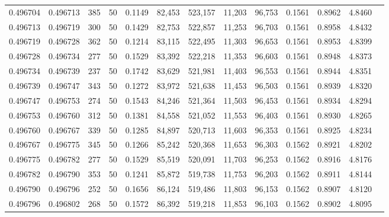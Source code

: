 \begin{tabular}{rrrrrrrrrrrrr}
0.496704 & 0.496713 & 385 &  50 &                                     0.1149 &  82,453 & 523,157 &  11,203 &  96,753 & 0.1561 & 0.8962 & 4.8460 \\
0.496713 & 0.496719 & 300 &  50 &                                     0.1429 &  82,753 & 522,857 &  11,253 &  96,703 & 0.1561 & 0.8958 & 4.8432 \\
0.496719 & 0.496728 & 362 &  50 &                                     0.1214 &  83,115 & 522,495 &  11,303 &  96,653 & 0.1561 & 0.8953 & 4.8399 \\
0.496728 & 0.496734 & 277 &  50 &                                     0.1529 &  83,392 & 522,218 &  11,353 &  96,603 & 0.1561 & 0.8948 & 4.8373 \\
0.496734 & 0.496739 & 237 &  50 &                                     0.1742 &  83,629 & 521,981 &  11,403 &  96,553 & 0.1561 & 0.8944 & 4.8351 \\
0.496739 & 0.496747 & 343 &  50 &                                     0.1272 &  83,972 & 521,638 &  11,453 &  96,503 & 0.1561 & 0.8939 & 4.8320 \\
0.496747 & 0.496753 & 274 &  50 &                                     0.1543 &  84,246 & 521,364 &  11,503 &  96,453 & 0.1561 & 0.8934 & 4.8294 \\
0.496753 & 0.496760 & 312 &  50 &                                     0.1381 &  84,558 & 521,052 &  11,553 &  96,403 & 0.1561 & 0.8930 & 4.8265 \\
0.496760 & 0.496767 & 339 &  50 &                                     0.1285 &  84,897 & 520,713 &  11,603 &  96,353 & 0.1561 & 0.8925 & 4.8234 \\
0.496767 & 0.496775 & 345 &  50 &                                     0.1266 &  85,242 & 520,368 &  11,653 &  96,303 & 0.1562 & 0.8921 & 4.8202 \\
0.496775 & 0.496782 & 277 &  50 &                                     0.1529 &  85,519 & 520,091 &  11,703 &  96,253 & 0.1562 & 0.8916 & 4.8176 \\
0.496782 & 0.496790 & 353 &  50 &                                     0.1241 &  85,872 & 519,738 &  11,753 &  96,203 & 0.1562 & 0.8911 & 4.8144 \\
0.496790 & 0.496796 & 252 &  50 &                                     0.1656 &  86,124 & 519,486 &  11,803 &  96,153 & 0.1562 & 0.8907 & 4.8120 \\
0.496796 & 0.496802 & 268 &  50 &                                     0.1572 &  86,392 & 519,218 &  11,853 &  96,103 & 0.1562 & 0.8902 & 4.8095 \\

\end{tabular}
